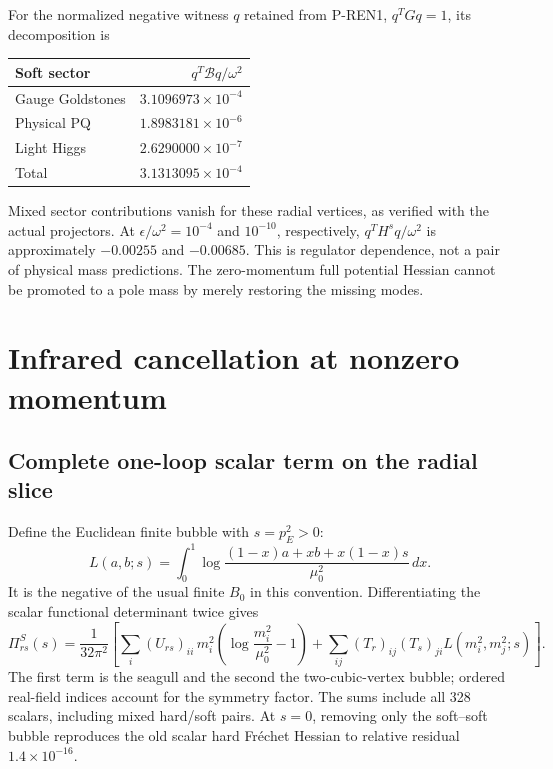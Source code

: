 \documentclass[11pt]{article}
\begin{document}
For the normalized negative witness $q$ retained from P-REN1,
$q^TGq=1$, its decomposition is
\begin{center}
\begin{tabular}{lr}
\toprule
Soft sector & $q^T\mathcal Bq/\omega^2$\\
\midrule
Gauge Goldstones & $3.1096973\times10^{-4}$\\
Physical PQ & $1.8983181\times10^{-6}$\\
Light Higgs & $2.6290000\times10^{-7}$\\
Total & $3.1313095\times10^{-4}$\\
\bottomrule
\end{tabular}
\end{center}
Mixed sector contributions vanish for these radial vertices, as
verified with the actual projectors. At $\epsilon/\omega^2=10^{-4}$
and $10^{-10}$, respectively, $q^TH^sq/\omega^2$ is approximately
$-0.00255$ and $-0.00685$. This is regulator dependence, not a pair
of physical mass predictions. The zero-momentum full potential Hessian
cannot be promoted to a pole mass by merely restoring the missing modes.

\section{Infrared cancellation at nonzero momentum}
\subsection{Complete one-loop scalar term on the radial slice}
Define the Euclidean finite bubble with $s=p_E^2>0$:
\begin{equation}
 L(a,b;s)=\int_0^1\log\frac{(1-x)a+xb+x(1-x)s}{\mu_0^2}\,dx.
 \label{eq:bubble}
\end{equation}
It is the negative of the usual finite $B_0$ in this convention.
Differentiating the scalar functional determinant twice gives
\begin{equation}
 \Pi^S_{rs}(s)=\frac1{32\pi^2}\left[
 \sum_i(U_{rs})_{ii}\,m_i^2\left(\log\frac{m_i^2}{\mu_0^2}-1\right)
 +\sum_{ij}(T_r)_{ij}(T_s)_{ji}L(m_i^2,m_j^2;s)\right].
 \label{eq:scalarself}
\end{equation}
The first term is the seagull and the second the two-cubic-vertex
bubble; ordered real-field indices account for the symmetry factor.
The sums include all 328 scalars, including mixed hard/soft pairs.
At $s=0$, removing only the soft--soft bubble reproduces the old scalar
hard Fr\'echet Hessian to relative residual $1.4\times10^{-16}$.
\end{document}
